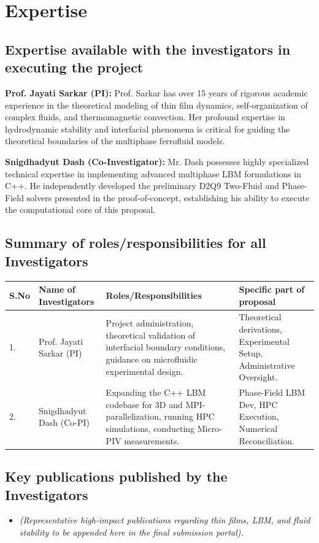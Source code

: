 \documentclass[11pt, a4paper]{article}
\begin{document}
\newpage
\section{Expertise}

\subsection{Expertise available with the investigators in executing the project}
\textbf{Prof. Jayati Sarkar (PI):} Prof. Sarkar has over 15 years of rigorous academic experience in the theoretical modeling of thin film dynamics, self-organization of complex fluids, and thermomagnetic convection. Her profound expertise in hydrodynamic stability and interfacial phenomena is critical for guiding the theoretical boundaries of the multiphase ferrofluid models.

\textbf{Snigdhadyut Dash (Co-Investigator):} Mr. Dash possesses highly specialized technical expertise in implementing advanced multiphase LBM formulations in C++. He independently developed the preliminary D2Q9 Two-Fluid and Phase-Field solvers presented in the proof-of-concept, establishing his ability to execute the computational core of this proposal.

\subsection{Summary of roles/responsibilities for all Investigators}
\begin{tabular}{|p{0.5cm}|p{3.5cm}|p{6cm}|p{4.5cm}|}
\hline
\textbf{S.No} & \textbf{Name of Investigators} & \textbf{Roles/Responsibilities} & \textbf{Specific part of proposal} \\
\hline
1. & Prof. Jayati Sarkar (PI) & Project administration, theoretical validation of interfacial boundary conditions, guidance on microfluidic experimental design. & Theoretical derivations, Experimental Setup, Administrative Oversight. \\
\hline
2. & Snigdhadyut Dash (Co-PI) & Expanding the C++ LBM codebase for 3D and MPI-parallelization, running HPC simulations, conducting Micro-PIV measurements. & Phase-Field LBM Dev, HPC Execution, Numerical Reconciliation. \\
\hline
\end{tabular}

\subsection{Key publications published by the Investigators}
\begin{itemize}
    \item \textit{(Representative high-impact publications regarding thin films, LBM, and fluid stability to be appended here in the final submission portal).}
\end{itemize}
\end{document}
